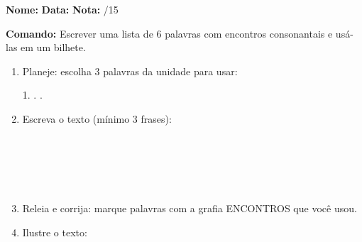 

\begin{exercicio}

\noindent\textbf{Nome:} \underline{\hspace{3.2cm}} \quad \textbf{Data:} \underline{\hspace{1.6cm}} \quad \textbf{Nota:} \underline{\hspace{0.9cm}}/15


\noindent\textbf{Comando:} Escrever uma lista de 6 palavras com encontros consonantais e usá-las em um bilhete.


\begin{enumerate}

  \item Planeje: escolha 3 palavras da unidade para usar:
  \begin{center}
  1. \underline{\hspace{3cm}} . \underline{\hspace{3cm}} . \underline{\hspace{3cm}}
  \end{center}

  \item Escreva o texto (mínimo 3 frases):
  \begin{center}
  \underline{\hspace{12cm}}\\\underline{\hspace{12cm}}\\\underline{\hspace{12cm}}\\\underline{\hspace{12cm}}\\\underline{\hspace{12cm}}
  \end{center}

  \item Releia e corrija: marque palavras com a grafia ENCONTROS que você usou.

  \item Ilustre o texto:
  \begin{center}
  \end{center}

\end{enumerate}

\end{exercicio}

